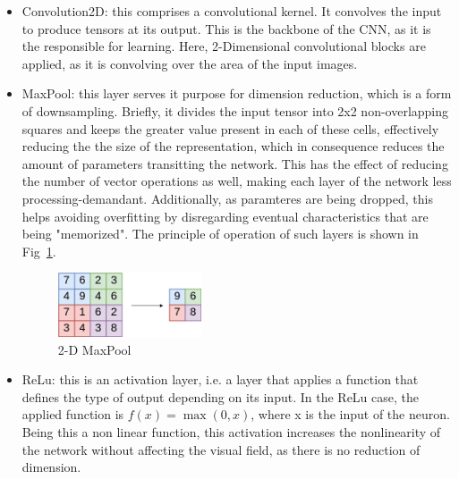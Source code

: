 \begin{itemize}
    \item Convolution2D: this comprises a convolutional kernel. It convolves the input to produce tensors at its output. This is the backbone of the \ac{CNN}, as it is the responsible for learning. Here, 2-Dimensional convolutional blocks are applied, as it is convolving over the area of the input images.
    \item MaxPool: this layer serves it purpose for dimension reduction, which is a form of downsampling. Briefly, it divides the input tensor into 2x2 non-overlapping squares and keeps the greater value present in each of these cells, effectively reducing the the size of the representation, which in consequence reduces the amount of parameters transitting the network. This has the effect of reducing the number of vector operations as well, making each layer of the network less processing-demandant. Additionally, as paramteres are being dropped, this helps avoiding overfitting by disregarding eventual characteristics that are being "memorized". The principle of operation of such layers is shown in Fig~\ref{fig:maxpool}.
        \begin{figure}[!htb]
            \centering
              \includegraphics[width=0.4\textwidth]{figures/maxpool}
              \caption{2-D MaxPool}
              \label{fig:maxpool}
        \end{figure}
    \item \ac{ReLu}: this is an activation layer, i.e. a layer that applies a function that defines the type of output depending on its input. In the \ac{ReLu} case, the applied function is \(f(x) =\max(0,x) \), where x is the input of the neuron. Being this a non linear function, this activation increases the nonlinearity of the network without affecting the visual field, as there is no reduction of dimension.
        \begin{figure}[!htb]
            \centering
\end{figure}
\end{itemize}
